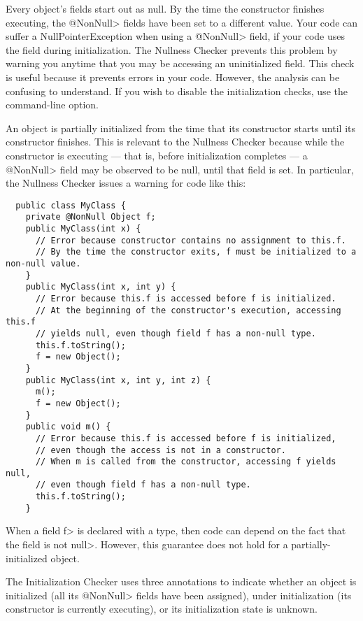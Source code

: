 Every object's fields start out as null.  By the time the constructor
finishes executing, the \<@NonNull> fields have been set to a different
value.  Your code can suffer a NullPointerException when using a
\<@NonNull> field, if your code uses the field during initialization.
The Nullness Checker prevents this problem by warning you anytime that you
may be accessing an uninitialized field.  This check is useful because it
prevents errors in your code.  However, the analysis can be confusing to
understand.  If you wish to disable the initialization checks, use
the  command-line option.

An object is partially initialized from the time that its constructor starts until its constructor
finishes.  This is relevant to the Nullness Checker because while the
constructor is executing --- that is, before initialization completes ---
a \<@NonNull>
field may be observed to be null, until that field is set.  In
particular, the Nullness Checker issues a warning for code like this:

\begin{Verbatim}
  public class MyClass {
    private @NonNull Object f;
    public MyClass(int x) {
      // Error because constructor contains no assignment to this.f.
      // By the time the constructor exits, f must be initialized to a non-null value.
    }
    public MyClass(int x, int y) {
      // Error because this.f is accessed before f is initialized.
      // At the beginning of the constructor's execution, accessing this.f
      // yields null, even though field f has a non-null type.
      this.f.toString();
      f = new Object();
    }
    public MyClass(int x, int y, int z) {
      m();
      f = new Object();
    }
    public void m() {
      // Error because this.f is accessed before f is initialized,
      // even though the access is not in a constructor.
      // When m is called from the constructor, accessing f yields null,
      // even though field f has a non-null type.
      this.f.toString();
    }
\end{Verbatim}

\noindent
When a field \<f> is declared with a 
type, then code can depend on the fact that the field is not \<null>.
However, this guarantee does not hold for a partially-initialized object.

The Initialization Checker uses three annotations to indicate whether an object
is initialized (all its \<@NonNull> fields have been assigned), under
initialization (its constructor is currently executing), or its
initialization state is unknown.

